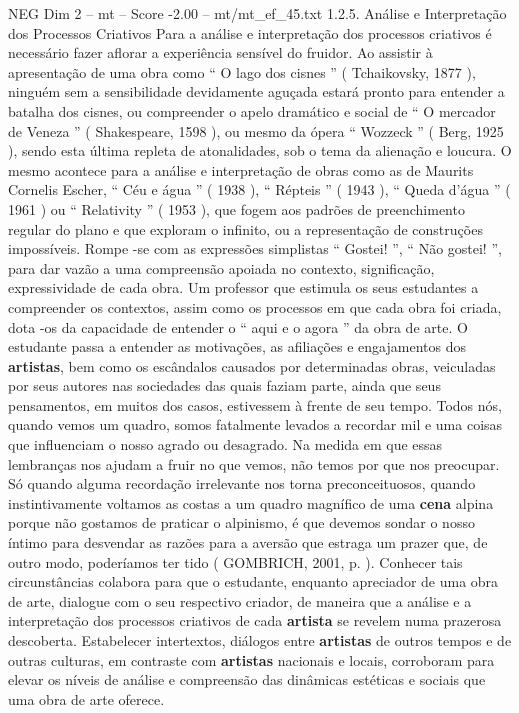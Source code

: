 \begin{textsample}{NEG Dim 2 – mt – Score -2.00 – mt/mt\_ef\_45.txt}  \label{ex:f2_neg_065}
1.2.5.
Análise e Interpretação dos Processos Criativos Para a análise e interpretação dos processos criativos é necessário fazer aflorar a experiência sensível do fruidor.
Ao assistir à apresentação de uma obra como “ O lago dos cisnes ” ( Tchaikovsky, 1877 ), ninguém sem a sensibilidade devidamente aguçada estará pronto para entender a batalha dos cisnes, ou compreender o apelo dramático e social de “ O mercador de Veneza ” ( Shakespeare, 1598 ), ou mesmo da ópera “ Wozzeck ” ( Berg, 1925 ), sendo esta última repleta de atonalidades, sob o tema da alienação e loucura.
O mesmo acontece para a análise e interpretação de obras como as de Maurits Cornelis Escher, “ Céu e água ” ( 1938 ), “ Répteis ” ( 1943 ), “ Queda d’água ” ( 1961 ) ou “ Relativity ” ( 1953 ), que fogem aos padrões de preenchimento regular do plano e que exploram o infinito, ou a representação de construções impossíveis.
Rompe -se com as expressões simplistas “ Gostei! ”, “ Não gostei! ”, para dar vazão a uma compreensão apoiada no contexto, significação, expressividade de cada obra.
Um professor que estimula os seus estudantes a compreender os contextos, assim como os processos em que cada obra foi criada, dota -os da capacidade de entender o “ aqui e o agora ” da obra de arte.
O estudante passa a entender as motivações, as afiliações e engajamentos dos \textbf{artistas}, bem como os escândalos causados por determinadas obras, veiculadas por seus autores nas sociedades das quais faziam parte, ainda que seus pensamentos, em muitos dos casos, estivessem à frente de seu tempo.
Todos nós, quando vemos um quadro, somos fatalmente levados a recordar mil e uma coisas que influenciam o nosso agrado ou desagrado.
Na medida em que essas lembranças nos ajudam a fruir no que vemos, não temos por que nos preocupar.
Só quando alguma recordação irrelevante nos torna preconceituosos, quando instintivamente voltamos as costas a um quadro magnífico de uma \textbf{cena} alpina porque não gostamos de praticar o alpinismo, é que devemos sondar o nosso íntimo para desvendar as razões para a aversão que estraga um prazer que, de outro modo, poderíamos ter tido ( GOMBRICH, 2001, p. ).
Conhecer tais circunstâncias colabora para que o estudante, enquanto apreciador de uma obra de arte, dialogue com o seu respectivo criador, de maneira que a análise e a interpretação dos processos criativos de cada \textbf{artista} se revelem numa prazerosa descoberta.
Estabelecer intertextos, diálogos entre \textbf{artistas} de outros tempos e de outras culturas, em contraste com \textbf{artistas} nacionais e locais, corroboram para elevar os níveis de análise e compreensão das dinâmicas estéticas e sociais que uma obra de arte oferece.

\end{textsample}
